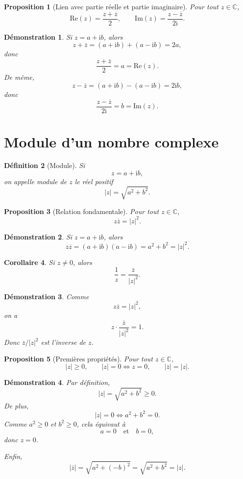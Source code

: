 \documentclass[11pt,a4paper]{article}
\newtheorem{definition}{Définition}[section]
\newtheorem{proposition}[definition]{Proposition}
\newtheorem{corollaire}[definition]{Corollaire}
\newtheorem*{demonstration}{Démonstration}
\newcommand{\C}{\mathbb{C}}
\newcommand{\ii}{\mathrm{i}}
\newcommand{\Ree}{\mathrm{Re}}
\newcommand{\Imm}{\mathrm{Im}}
\begin{document}
\begin{proposition}[Lien avec partie réelle et partie imaginaire]
Pour tout $z\in \C$,
\[
\Ree(z)=\frac{z+\overline{z}}{2},
\qquad
\Imm(z)=\frac{z-\overline{z}}{2\ii}.
\]
\end{proposition}

\begin{demonstration}
Si $z=a+\ii b$, alors
\[
z+\overline{z}=(a+\ii b)+(a-\ii b)=2a,
\]
donc
\[
\frac{z+\overline{z}}{2}=a=\Ree(z).
\]
De même,
\[
z-\overline{z}=(a+\ii b)-(a-\ii b)=2\ii b,
\]
donc
\[
\frac{z-\overline{z}}{2\ii}=b=\Imm(z).
\]
\end{demonstration}

\section{Module d'un nombre complexe}

\begin{definition}[Module]
Si
\[
z=a+\ii b,
\]
on appelle \emph{module} de $z$ le réel positif
\[
|z|=\sqrt{a^2+b^2}.
\]
\end{definition}

\begin{proposition}[Relation fondamentale]
Pour tout $z\in \C$,
\[
z\overline{z}=|z|^2.
\]
\end{proposition}

\begin{demonstration}
Si $z=a+\ii b$, alors
\[
z\overline{z}=(a+\ii b)(a-\ii b)=a^2+b^2=|z|^2.
\]
\end{demonstration}

\begin{corollaire}
Si $z\neq 0$, alors
\[
\frac1z=\frac{\overline{z}}{|z|^2}.
\]
\end{corollaire}

\begin{demonstration}
Comme
\[
z\overline{z}=|z|^2,
\]
on a
\[
z\cdot \frac{\overline{z}}{|z|^2}=1.
\]
Donc $\overline{z}/|z|^2$ est l'inverse de $z$.
\end{demonstration}

\begin{proposition}[Premières propriétés]
Pour tout $z\in \C$,
\[
|z|\geq 0,
\qquad
|z|=0 \iff z=0,
\qquad
|\overline{z}|=|z|.
\]
\end{proposition}

\begin{demonstration}
Par définition,
\[
|z|=\sqrt{a^2+b^2}\geq 0.
\]
De plus,
\[
|z|=0 \iff a^2+b^2=0.
\]
Comme $a^2\geq 0$ et $b^2\geq 0$, cela équivaut à
\[
a=0 \quad \text{et} \quad b=0,
\]
donc $z=0$.

Enfin,
\[
|\overline{z}|=\sqrt{a^2+(-b)^2}=\sqrt{a^2+b^2}=|z|.
\]
\end{demonstration}
\end{document}
